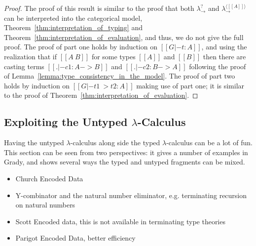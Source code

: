 \begin{proof}
  The proof of this result is similar to the proof that both
  $\lambda^?_\to$ and $\lambda^{\langle [[A]] \rangle}_\to$ can be
  interpreted into the categorical model,
  Theorem~\ref{thm:interpretation_of_typing} and
  Theorem~\ref{thm:interpretation_of_evaluation}, and thus, we do not
  give the full proof.  The proof of part one holds by induction on
  $[[G |- t : A]]$, and using the realization that if $[[A ~ B]]$ for
  some types $[[A]]$ and $[[B]]$ then there are casting terms $[[. |-
      c1 : A -> B]]$ and $[[. |- c2 : B -> A]]$ following the proof of
  Lemma~\ref{lemma:type_consistency_in_the_model}. The proof of part
  two holds by induction on $[[G |- t1 ~> t2 : A]]$ making use of part
  one; it is similar to the proof of
  Theorem~\ref{thm:interpretation_of_evaluation}.
\end{proof}

\subsection{Exploiting the Untyped $\lambda$-Calculus}
\label{subsec:exploiting_the_untyped_lambda-calculus}
Having the untyped $\lambda$-calculus along side the typed
$\lambda$-calculus can be a lot of fun.  This section can be seen from
two perspectives: it gives a number of examples in Grady, and shows
several ways the typed and untyped fragments can be mixed.
\begin{itemize}
\item Church Encoded Data
\item Y-combinator and the natural number eliminator, e.g. terminating recursion on natural numbers
\item Scott Encoded data, this is not available in terminating type theories
\item Parigot Encoded Data, better efficiency 
\end{itemize}

